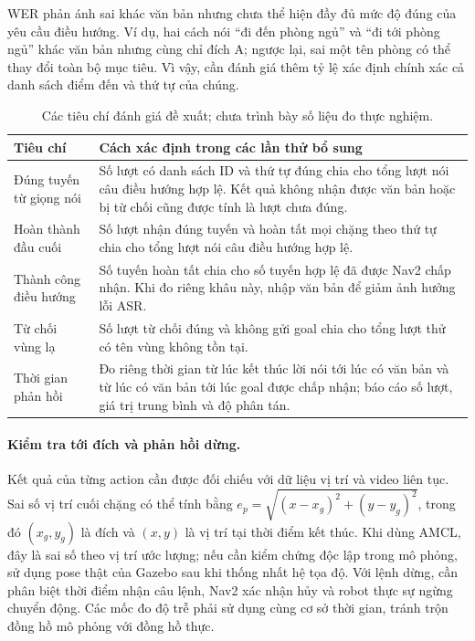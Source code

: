 \documentclass[13pt,a4paper]{extarticle}
\newcommand{\code}[1]{%
    \path{#1}%
}
\begin{document}
WER phản ánh sai khác văn bản nhưng chưa thể hiện đầy đủ mức độ đúng của yêu cầu điều hướng. Ví dụ, hai cách nói ``đi đến phòng ngủ'' và ``đi tới phòng ngủ'' khác văn bản nhưng cùng chỉ đích A; ngược lại, sai một tên phòng có thể thay đổi toàn bộ mục tiêu. Vì vậy, cần đánh giá thêm tỷ lệ xác định chính xác cả danh sách điểm đến và thứ tự của chúng.

\begin{table}[!htbp]
\centering\small
\renewcommand{\arraystretch}{1.15}
\begin{tabularx}{\linewidth}{@{}L{3.7cm}Y@{}}
\toprule
\textbf{Tiêu chí} & \textbf{Cách xác định trong các lần thử bổ sung} \\
\midrule
Đúng tuyến từ giọng nói & Số lượt có danh sách ID và thứ tự đúng chia cho tổng lượt nói câu điều hướng hợp lệ. Kết quả không nhận được văn bản hoặc bị từ chối cũng được tính là lượt chưa đúng. \\
Hoàn thành đầu cuối & Số lượt nhận đúng tuyến và hoàn tất mọi chặng theo thứ tự chia cho tổng lượt nói câu điều hướng hợp lệ. \\
Thành công điều hướng & Số tuyến hoàn tất chia cho số tuyến hợp lệ đã được Nav2 chấp nhận. Khi đo riêng khâu này, nhập văn bản để giảm ảnh hưởng lỗi ASR. \\
Từ chối vùng lạ & Số lượt từ chối đúng và không gửi goal chia cho tổng lượt thử có tên vùng không tồn tại. \\
Thời gian phản hồi & Đo riêng thời gian từ lúc kết thúc lời nói tới lúc có văn bản và từ lúc có văn bản tới lúc goal được chấp nhận; báo cáo số lượt, giá trị trung bình và độ phân tán. \\
\bottomrule
\end{tabularx}
\caption{Các tiêu chí đánh giá đề xuất; chưa trình bày số liệu đo thực nghiệm.}
\label{tab:evaluation-criteria}
\end{table}

\paragraph{Kiểm tra tới đích và phản hồi dừng.}
Kết quả \code{STATUS_SUCCEEDED} của từng action cần được đối chiếu với dữ liệu vị trí và video liên tục. Sai số vị trí cuối chặng có thể tính bằng $e_p=\sqrt{(x-x_g)^2+(y-y_g)^2}$, trong đó $(x_g,y_g)$ là đích và $(x,y)$ là vị trí tại thời điểm kết thúc. Khi dùng AMCL, đây là sai số theo vị trí ước lượng; nếu cần kiểm chứng độc lập trong mô phỏng, sử dụng pose thật của Gazebo sau khi thống nhất hệ tọa độ. Với lệnh dừng, cần phân biệt thời điểm nhận câu lệnh, Nav2 xác nhận hủy và robot thực sự ngừng chuyển động. Các mốc đo độ trễ phải sử dụng cùng cơ sở thời gian, tránh trộn đồng hồ mô phỏng với đồng hồ thực.
\end{document}
